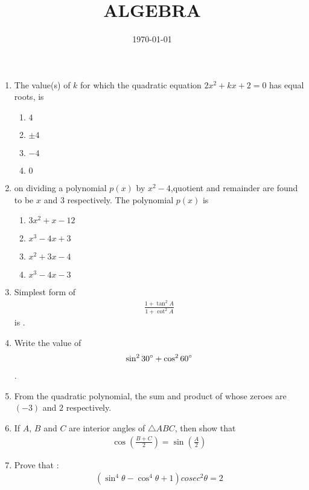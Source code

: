 \documentclass[12pt]{article}
\providecommand{\brak}[1]{\ensuremath{\left(#1\right)}}
\begin{document}
\title{ALGEBRA}
\date{ \today}
\maketitle
\begin{enumerate}

\item The value(s) of $k$ for which the quadratic equation $2x^2 + kx + 2 = 0$ has equal roots, is 
\begin{enumerate}[label =(\Alph*)]
\item $4$ 
\item $\pm 4$
\item $-4$
\item $0$ 
\end{enumerate}

\item on dividing a polynomial $p(x)$ by $x^2 - 4$,quotient and remainder are found to be $x$ and $3$ respectively. The polynomial $p(x)$ is 
\begin{enumerate}[label =(\Alph*)]
\item $3x^2 + x - 12$
\item $x^3 - 4x + 3$
\item $x^2 + 3x - 4$
\item $x^3 - 4x - 3$
\end{enumerate}

\item Simplest form of 
 \begin{align*}
     \frac{1 + \tan^{2}{A}}{1 + \cot^{2}{A}}
 \end{align*}is .

\item Write the value of
 \begin{align*}
	     \sin^{2}{30\degree} + \cos^{2}{60\degree}
	\end{align*}.
\item From the quadratic polynomial, the sum and product  of whose zeroes are $(-3)$ and $2$ respectively.

\item If $A$, $B$ and $C$ are interior angles of $ \triangle ABC$, then show that
	\begin{align*}
	    \cos \brak{\frac{B + C}{2}}=\sin \brak{\frac{A}{2}}
	\end{align*}
      
\item Prove that : 
        \begin{align}
           (\sin^{4}{\theta} - \cos^{4}{\theta} + 1)cosec^{2}{\theta} = 2 
        \end{align}
  

\end{enumerate}
\end{document}
